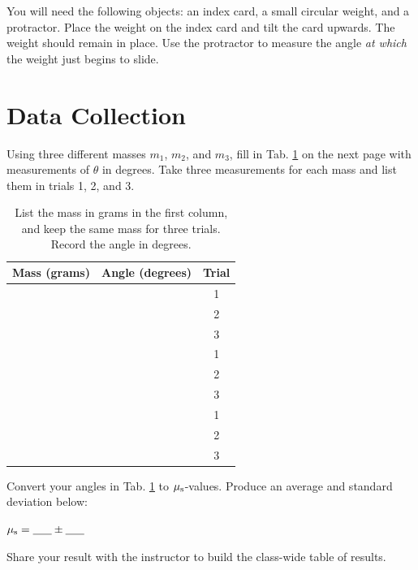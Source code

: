 \documentclass{article}
\begin{document}
You will need the following objects: an index card, a small circular weight, and a protractor.  Place the weight on the index card and tilt the card upwards. The weight should remain in place.  Use the protractor to measure the angle \textit{at which} the weight just begins to slide.

\section{Data Collection}

Using three different masses $m_1$, $m_2$, and $m_3$, fill in Tab. \ref{tab:meas} on the next page with measurements of $\theta$ in degrees.  Take three measurements for each mass and list them in trials 1, 2, and 3. \\ \vspace{2cm}

\begin{table}
\centering
\begin{tabular}{| c | c | c |}
\hline
Mass (grams) & Angle (degrees) & Trial \\ \hline
& & 1 \\ \hline
& & 2 \\ \hline
& & 3 \\ \hline
& & 1 \\ \hline
& & 2 \\ \hline
& & 3 \\ \hline
& & 1 \\ \hline
& & 2 \\ \hline
& & 3 \\ \hline
\end{tabular}
\caption{\label{tab:meas} List the mass in grams in the first column, and keep the same mass for three trials.  Record the angle in degrees.}
\end{table}

Convert your angles in Tab. \ref{tab:meas} to $\mu_{\rm s}$-values.  Produce an average and standard deviation below: \\ \vspace{1cm}

$\mu_{\rm s} = \underline{~~~~~}\pm\underline{~~~~~}$ \\ \vspace{0.5cm}

Share your result with the instructor to build the class-wide table of results.
\end{document}
